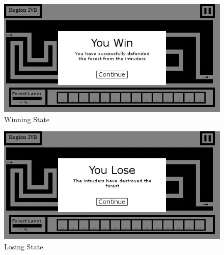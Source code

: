 \documentclass[journal]{./IEEE/IEEEtran}
\begin{document}
\begin{figure}\centering
\label{win}
\includegraphics[width=\linewidth]{[Eden]End-Win.jpg}
\caption{Winning State}
\end{figure}
\begin{figure}\centering
\label{lose}
\includegraphics[width=\linewidth]{[Eden]End-Lose.jpg}
\caption{Losing State}
\end{figure}




\end{document}
